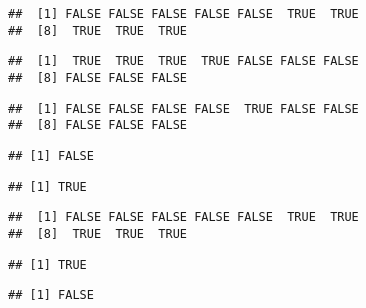 \documentclass[paper=a4,headsepline,BCOR=12mm,twoside,open=right,%
titlepage,headings=small,fontsize=10pt,index=totoc,bibliography=totoc,%
captions=tableheading,captions=nooneline]{scrbook}\usepackage{knitr}
\begin{document}
\begin{knitrout}\footnotesize
{}\color{fgcolor}\begin{kframe}
\begin{alltt}
 \hlkwb{<-} \hlopt{:}
 \hlopt{>} 
\end{alltt}
\begin{verbatim}
##  [1] FALSE FALSE FALSE FALSE FALSE  TRUE  TRUE
##  [8]  TRUE  TRUE  TRUE
\end{verbatim}
\begin{alltt}
 \hlopt{<} 
\end{alltt}
\begin{verbatim}
##  [1]  TRUE  TRUE  TRUE  TRUE FALSE FALSE FALSE
##  [8] FALSE FALSE FALSE
\end{verbatim}
\begin{alltt}
 \hlopt{==} 
\end{alltt}
\begin{verbatim}
##  [1] FALSE FALSE FALSE FALSE  TRUE FALSE FALSE
##  [8] FALSE FALSE FALSE
\end{verbatim}
\begin{alltt}
 \hlopt{>} \hlstd{)}
\end{alltt}
\begin{verbatim}
## [1] FALSE
\end{verbatim}
\begin{alltt}
 \hlopt{>} \hlstd{)}
\end{alltt}
\begin{verbatim}
## [1] TRUE
\end{verbatim}
\begin{alltt}
 \hlkwb{<-}  \hlopt{>} 
\end{alltt}
\begin{verbatim}
##  [1] FALSE FALSE FALSE FALSE FALSE  TRUE  TRUE
##  [8]  TRUE  TRUE  TRUE
\end{verbatim}
\begin{alltt}
\end{alltt}
\begin{verbatim}
## [1] TRUE
\end{verbatim}
\begin{alltt}
\end{alltt}
\begin{verbatim}
## [1] FALSE
\end{verbatim}
\end{kframe}
\end{knitrout}
\end{document}
